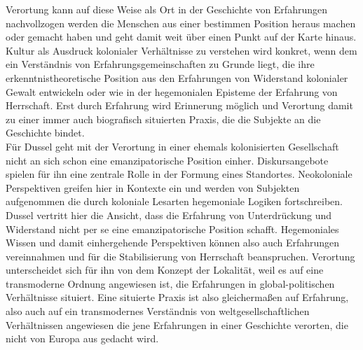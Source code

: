 \noindent Verortung kann auf diese Weise als Ort in der Geschichte von Erfahrungen
nachvollzogen werden die Menschen aus einer bestimmen Position heraus machen
oder gemacht haben und geht damit weit über einen Punkt auf der Karte hinaus.\\
Kultur als Ausdruck kolonialer Verhältnisse zu verstehen wird konkret, wenn dem
ein Verständnis von Erfahrungsgemeinschaften zu Grunde liegt, die ihre
erkenntnistheoretische Position aus den Erfahrungen von Widerstand kolonialer
Gewalt entwickeln oder wie in der hegemonialen Episteme der Erfahrung von
Herrschaft. Erst durch Erfahrung wird Erinnerung möglich und Verortung damit zu
einer immer auch biografisch situierten Praxis, die die Subjekte an die
Geschichte bindet. \\
Für Dussel geht mit der Verortung in einer ehemals
kolonisierten Gesellschaft nicht an sich schon eine emanzipatorische Position
einher. Diskursangebote spielen für ihn eine zentrale Rolle in der Formung eines
Standortes. Neokoloniale Perspektiven greifen hier in Kontexte ein und werden
von Subjekten aufgenommen die durch koloniale Lesarten hegemoniale Logiken
fortschreiben. \\
Dussel vertritt hier die Ansicht, dass die Erfahrung von
Unterdrückung und Widerstand nicht per se eine emanzipatorische Position
schafft. Hegemoniales Wissen und damit einhergehende Perspektiven können also
auch Erfahrungen vereinnahmen und für die Stabilisierung von Herrschaft
beanspruchen. Verortung unterscheidet sich für ihn von dem Konzept der
Lokalität, weil es auf eine transmoderne Ordnung angewiesen ist, die Erfahrungen
in global-politischen Verhältnisse situiert. Eine situierte Praxis ist also
gleichermaßen auf Erfahrung, also auch auf ein transmodernes Verständnis von
weltgesellschaftlichen Verhältnissen angewiesen die jene Erfahrungen in einer
Geschichte verorten, die nicht von Europa aus gedacht wird.\\

